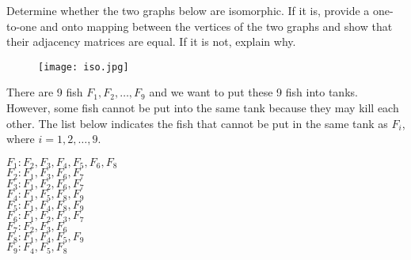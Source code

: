 \documentclass[letterpaper,9pt,addpoints]{exam}
\begin{document}
\begin{questions}



  \newpage 

\question[25]Determine whether the two graphs below are isomorphic. If it is, provide a one-to-one and onto mapping between the vertices of the two graphs and show that their adjacency matrices are equal. If it is not, explain why.
\begin{figure}[htbp] %
  \center
  \texttt{[image: iso.jpg]}
  \end{figure}

\newpage
\question[25]
There are 9 fish $F_1,F_2,\dots,F_{9}$ and we want to put these 9 fish into tanks. However, some fish cannot be put into the same tank because they may kill each other. The list below indicates the fish that cannot be put in the same tank as $F_i$, where $i=1,2,\dots,9$.

$F_1: F_2, F_3, F_4, F_5, F_6, F_8$\\
$F_2:F_1,F_3,F_6,F_7$\\
$F_3:F_1,F_2,F_6,F_7$ \\
$F_4: F_1, F_5, F_8, F_9$\\
$F_5:F_1,F_4,F_8,F_9$\\
$F_6:F_1,F_2,F_3,F_7$\\
$F_7: F_2, F_3, F_6$\\
$F_8:F_1,F_4,F_5,F_9$\\
$F_9:F_4,F_5,F_8$



\end{questions}
\end{document}
